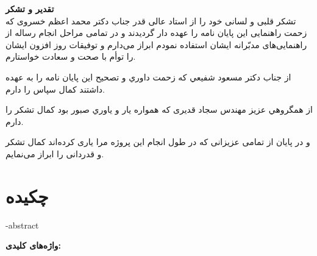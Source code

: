 \newpage\thispagestyle{empty}
\textbf{تقدیر و تشکر}
\\[2cm]

تشکر قلبی و لسانی خود را از استاد عالی قدر جناب دکتر محمد اعظم خسروی که زحمت راهنمایی این پایان نامه را عهده دار گردیدند و در تمامی مراحل انجام رساله از راهنمایی‌های مدبّرانه ایشان استفاده نمودم ابراز می‌دارم و توفیقات روز افزون ایشان را توأم با صحت و سعادت خواستارم.

از جناب دكتر مسعود شفيعي كه زحمت داوري و تصحيح اين پايان نامه را به عهده داشتند كمال سپاس را دارم.

از همگروهي عزيز مهندس سجاد قدیری كه همواره يار و ياوري صبور بود كمال تشكر را دارم.
 
و در پایان از تمامی عزیزانی که در طول انجام این پروژه مرا یاری کرده‌اند کمال تشکر و قدردانی را ابراز می‌نمایم.






















\newpage\clearpage

\pagestyle{style2}

\vspace*{-1cm}
\section*{\centering چکیده}
\vspace*{.5cm}
\ffa-abstract
\vspace*{2cm}


{\noindent\large\textbf{واژه‌های کلیدی:}}\par
\vspace*{.5cm}
\fkeywords